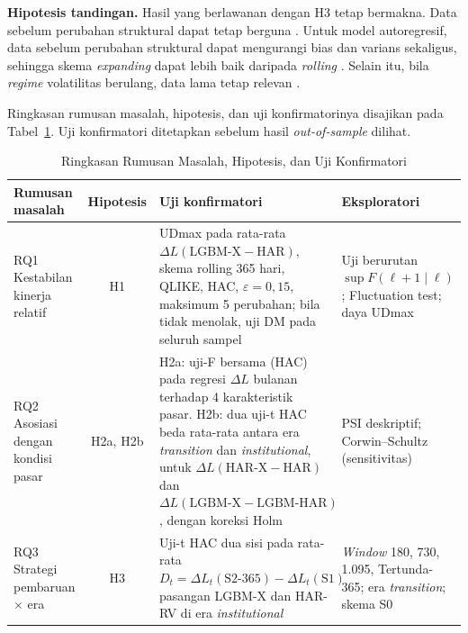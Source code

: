 \textbf{Hipotesis tandingan.} Hasil yang berlawanan dengan H3 tetap bermakna.
Data sebelum perubahan struktural dapat tetap berguna \cite{pesaran2007}.
Untuk model autoregresif, data sebelum perubahan struktural dapat mengurangi
bias dan varians sekaligus, sehingga skema \textit{expanding} dapat lebih baik
daripada \textit{rolling} \cite{rossi2013}. Selain itu, bila \textit{regime}
volatilitas berulang, data lama tetap relevan \cite{gama2014,suarez2023}.

Ringkasan rumusan masalah, hipotesis, dan uji konfirmatorinya disajikan pada
Tabel~\ref{tab:ringkasan}. Uji konfirmatori ditetapkan sebelum hasil
\textit{out-of-sample} dilihat.

\begin{table}[htbp]
  \caption{Ringkasan Rumusan Masalah, Hipotesis, dan Uji Konfirmatori}
  \label{tab:ringkasan}
  \centering
  \begingroup
  \small
  \begin{tabular}{|p{}|c|p{}|p{}|}
    \hline
    \textbf{Rumusan masalah} & \textbf{Hipotesis} &
    \textbf{Uji konfirmatori} & \textbf{Eksploratori} \\
    \hline
    RQ1 Kestabilan kinerja relatif & H1 &
    UDmax pada rata-rata $\Delta L(\text{LGBM-X} - \text{HAR})$, skema rolling
    365 hari, QLIKE, HAC, $\varepsilon = 0{,}15$, maksimum 5 perubahan; bila
    tidak menolak, uji DM pada seluruh sampel &
    Uji berurutan $\sup F(\ell+1 \mid \ell)$; Fluctuation test; daya UDmax \\
    \hline
    RQ2 Asosiasi dengan kondisi pasar & H2a, H2b &
    H2a: uji-F bersama (HAC) pada regresi $\Delta L$ bulanan terhadap
    4 karakteristik pasar. H2b: dua uji-t HAC beda rata-rata antara era
    \textit{transition} dan \textit{institutional}, untuk
    $\Delta L(\text{HAR-X} - \text{HAR})$ dan
    $\Delta L(\text{LGBM-X} - \text{LGBM-HAR})$, dengan koreksi Holm &
    PSI deskriptif; Corwin--Schultz (sensitivitas) \\
    \hline
    RQ3 Strategi pembaruan $\times$ era & H3 &
    Uji-t HAC dua sisi pada rata-rata
    $D_t = \Delta L_t(\text{S2-365}) - \Delta L_t(\text{S1})$ pasangan LGBM-X
    dan HAR-RV di era \textit{institutional} &
    \textit{Window} 180, 730, 1.095, Tertunda-365; era \textit{transition};
    skema S0 \\
    \hline
  \end{tabular}
  \endgroup
\end{table}
